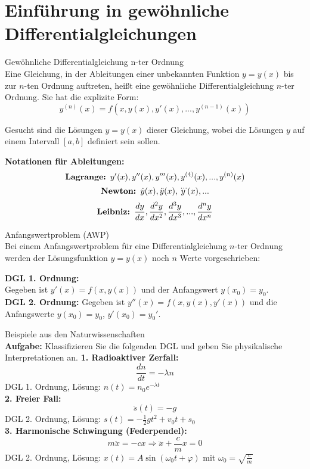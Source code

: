 \section{Einführung in gewöhnliche Differentialgleichungen}

\begin{definition}{Gewöhnliche Differentialgleichung n-ter Ordnung}\\
Eine Gleichung, in der Ableitungen einer unbekannten Funktion $y = y(x)$ bis zur $n$-ten Ordnung auftreten, heißt eine gewöhnliche Differentialgleichung $n$-ter Ordnung. Sie hat die explizite Form:
$$y^{(n)}(x) = f\left(x, y(x), y'(x), ..., y^{(n-1)}(x)\right)$$

Gesucht sind die Lösungen $y = y(x)$ dieser Gleichung, wobei die Lösungen $y$ auf einem Intervall $[a,b]$ definiert sein sollen.

\textbf{Notationen für Ableitungen:}
$$\text{\textbf{Lagrange: }} y'(x), y''(x), y'''(x), y^{(4)}(x), ..., y^{(n)}(x)$$
$$\text{\textbf{Newton: }} \dot{y}(x), \ddot{y}(x), \dddot{y}(x), ...$$
$$\text{\textbf{Leibniz: }} \frac{dy}{dx}, \frac{d^2y}{dx^2}, \frac{d^3y}{dx^3}, ..., \frac{d^ny}{dx^n}$$
\end{definition}

\begin{definition}{Anfangswertproblem (AWP)}\\
Bei einem Anfangswertproblem für eine Differentialgleichung $n$-ter Ordnung werden der Lösungsfunktion $y = y(x)$ noch $n$ Werte vorgeschrieben:

\textbf{DGL 1. Ordnung:} \\
Gegeben ist $y'(x) = f(x, y(x))$ und der Anfangswert $y(x_0) = y_0$.
\vspace{2mm}\\
\textbf{DGL 2. Ordnung:} 
Gegeben ist $y''(x) = f(x, y(x), y'(x))$ und die Anfangswerte $y(x_0) = y_0$, $y'(x_0) = y_0'$.
\end{definition}

\begin{example2}{Beispiele aus den Naturwissenschaften}\\
\textbf{Aufgabe:} Klassifizieren Sie die folgenden DGL und geben Sie physikalische Interpretationen an.
\tcblower
\textbf{1. Radioaktiver Zerfall:}
$$\frac{dn}{dt} = -\lambda n$$
DGL 1. Ordnung, Lösung: $n(t) = n_0 e^{-\lambda t}$
\vspace{2mm}\\
\textbf{2. Freier Fall:}
$$\ddot{s}(t) = -g$$
DGL 2. Ordnung, Lösung: $s(t) = -\frac{1}{2}gt^2 + v_0 t + s_0$
\vspace{2mm}\\
\textbf{3. Harmonische Schwingung (Federpendel):}
$$m\ddot{x} = -cx \Rightarrow \ddot{x} + \frac{c}{m}x = 0$$
DGL 2. Ordnung, Lösung: $x(t) = A \sin(\omega_0 t + \varphi)$ mit $\omega_0 = \sqrt{\frac{c}{m}}$
\end{example2}

